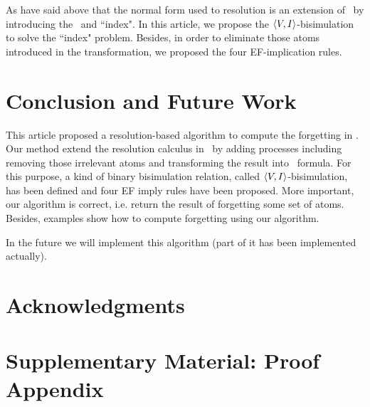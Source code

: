 \documentclass{article}
\begin{document}
 As have said above that the normal form used to resolution is an extension of \CTL\ by introducing the \start\ and ``index".
 In this article, we propose the ${\langle{V,I}\rangle}$-bisimulation to solve the ``index" problem.
 Besides, in order to eliminate those atoms introduced in the transformation, we proposed the four EF-implication rules.

\section{Conclusion and Future Work}
This article proposed a resolution-based algorithm to compute the forgetting in \CTL.
Our method extend the resolution calculus in~\cite{zhang2014resolution} by adding processes including removing those irrelevant atoms and transforming the result into \CTL\ formula.
For this purpose, a kind of binary bisimulation relation, called ${\langle{V,I}\rangle}$-bisimulation, has been defined and four EF imply rules have been proposed.
More important, our algorithm is correct, i.e. return the result of forgetting some set of atoms.
Besides, examples show how to compute forgetting using our algorithm.

In the future we will implement this algorithm (part of it has been implemented actually).


\section*{Acknowledgments}


\appendix
\section{Supplementary Material: Proof Appendix}
\end{document}

